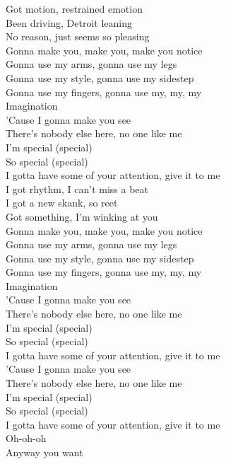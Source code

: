 {
	Got motion, restrained emotion \\
	Been driving, Detroit leaning \\
	No reason, just seems so pleasing \\
	Gonna make you, make you, make you notice \\
	Gonna use my arms, gonna use my legs \\
	Gonna use my style, gonna use my sidestep \\
	Gonna use my fingers, gonna use my, my, my \\
	Imagination \\
	'Cause I gonna make you see \\
	There's nobody else here, no one like me \\
	I'm special (special) \\
	So special (special) \\
	I gotta have some of your attention, give it to me \\
	I got rhythm, I can't miss a beat \\
	I got a new skank, so reet \\
	Got something, I'm winking at you \\
	Gonna make you, make you, make you notice \\
	Gonna use my arms, gonna use my legs \\
	Gonna use my style, gonna use my sidestep \\
	Gonna use my fingers, gonna use my, my, my \\
	Imagination \\
	'Cause I gonna make you see \\
	There's nobody else here, no one like me \\
	I'm special (special) \\
	So special (special) \\
	I gotta have some of your attention, give it to me \\
	'Cause I gonna make you see \\
	There's nobody else here, no one like me \\
	I'm special (special) \\
	So special (special) \\
	I gotta have some of your attention, give it to me \\
	Oh-oh-oh \\
	Anyway you want \\
}